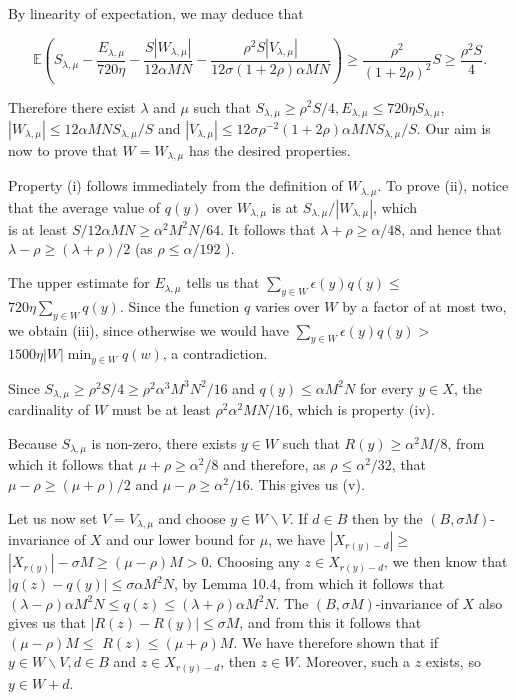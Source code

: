 \documentclass[10pt]{article}
\begin{document}
By linearity of expectation, we may deduce that

$$
\mathbb{E}\left(S_{\lambda, \mu}-\frac{E_{\lambda, \mu}}{720 \eta}-\frac{S\left|W_{\lambda, \mu}\right|}{12 \alpha M N}-\frac{\rho^{2} S\left|V_{\lambda, \mu}\right|}{12 \sigma(1+2 \rho) \alpha M N}\right) \geqslant \frac{\rho^{2}}{(1+2 \rho)^{2}} S \geqslant \frac{\rho^{2} S}{4} .
$$

Therefore there exist $\lambda$ and $\mu$ such that $S_{\lambda, \mu} \geqslant \rho^{2} S / 4, E_{\lambda, \mu} \leqslant 720 \eta S_{\lambda, \mu}$, $\left|W_{\lambda, \mu}\right| \leqslant 12 \alpha M N S_{\lambda, \mu} / S$ and $\left|V_{\lambda, \mu}\right| \leqslant 12 \sigma \rho^{-2}(1+2 \rho) \alpha M N S_{\lambda, \mu} / S$. Our aim is now to prove that $W=W_{\lambda, \mu}$ has the desired properties.

Property (i) follows immediately from the definition of $W_{\lambda, \mu}$. To prove (ii), notice that the average value of $q(y)$ over $W_{\lambda, \mu}$ is at $S_{\lambda, \mu} /\left|W_{\lambda, \mu}\right|$, which\\
is at least $S / 12 \alpha M N \geqslant \alpha^{2} M^{2} N / 64$. It follows that $\lambda+\rho \geqslant \alpha / 48$, and hence that $\lambda-\rho \geqslant(\lambda+\rho) / 2$ (as $\rho \leqslant \alpha / 192$ ).

The upper estimate for $E_{\lambda, \mu}$ tells us that $\sum_{y \in W} \epsilon(y) q(y) \leqslant$ $720 \eta \sum_{y \in W} q(y)$. Since the function $q$ varies over $W$ by a factor of at most two, we obtain (iii), since otherwise we would have $\sum_{y \in W} \epsilon(y) q(y)>$ $1500 \eta|W| \min _{y \in W} q(w)$, a contradiction.

Since $S_{\lambda, \mu} \geqslant \rho^{2} S / 4 \geqslant \rho^{2} \alpha^{3} M^{3} N^{2} / 16$ and $q(y) \leqslant \alpha M^{2} N$ for every $y \in X$, the cardinality of $W$ must be at least $\rho^{2} \alpha^{2} M N / 16$, which is property (iv).

Because $S_{\lambda, \mu}$ is non-zero, there exists $y \in W$ such that $R(y) \geqslant \alpha^{2} M / 8$, from which it follows that $\mu+\rho \geqslant \alpha^{2} / 8$ and therefore, as $\rho \leqslant \alpha^{2} / 32$, that $\mu-\rho \geqslant(\mu+\rho) / 2$ and $\mu-\rho \geqslant \alpha^{2} / 16$. This gives us (v).

Let us now set $V=V_{\lambda, \mu}$ and choose $y \in W \backslash V$. If $d \in B$ then by the $(B, \sigma M)$-invariance of $X$ and our lower bound for $\mu$, we have $\left|X_{r(y)-d}\right| \geqslant$ $\left|X_{r(y)}\right|-\sigma M \geqslant(\mu-\rho) M>0$. Choosing any $z \in X_{r(y)-d}$, we then know that $|q(z)-q(y)| \leqslant \sigma \alpha M^{2} N$, by Lemma 10.4, from which it follows that $(\lambda-\rho) \alpha M^{2} N \leqslant q(z) \leqslant(\lambda+\rho) \alpha M^{2} N$. The $(B, \sigma M)$-invariance of $X$ also gives us that $|R(z)-R(y)| \leqslant \sigma M$, and from this it follows that $(\mu-\rho) M \leqslant$ $R(z) \leqslant(\mu+\rho) M$. We have therefore shown that if $y \in W \backslash V, d \in B$ and $z \in X_{r(y)-d}$, then $z \in W$. Moreover, such a $z$ exists, so $y \in W+d$.
\end{document}

